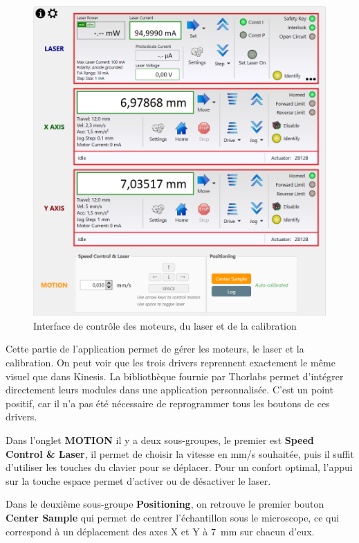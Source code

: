 \begin{figure}[H]
    \centering
    \includegraphics[width=\textwidth]{assets/figures/Application_ServoVision/Moteurs_Laser_Calibration.png}
    \caption{Interface de contrôle des moteurs, du laser et de la calibration}
    \label{Moteurs_Laser_Calibration}
\end{figure}
Cette partie de l'application permet de gérer les moteurs, le laser et la calibration. On peut voir que les trois drivers reprennent exactement le même visuel que dans Kinesis. La bibliothèque fournie par Thorlabs permet d'intégrer directement leurs modules dans une application personnalisée. C'est un point positif, car il n'a pas été nécessaire de reprogrammer tous les boutons de ces drivers.

Dans l'onglet \textcolor[RGB]{241,158,56}{\textbf{MOTION}} il y a deux sous-groupes, le premier est \textbf{Speed Control \& Laser}, il permet de choisir la vitesse en mm/s souhaitée, puis il suffit d'utiliser les touches du clavier pour se déplacer. Pour un confort optimal, l'appui sur la touche espace permet d'activer ou de désactiver le laser.

\newpage
Dans le deuxième sous-groupe \textbf{Positioning}, on retrouve le premier bouton \textcolor[RGB]{241,158,56}{\textbf{Center Sample}} qui permet de centrer l'échantillon sous le microscope, ce qui correspond à un déplacement des axes X et Y à 7~mm sur chacun d'eux.

